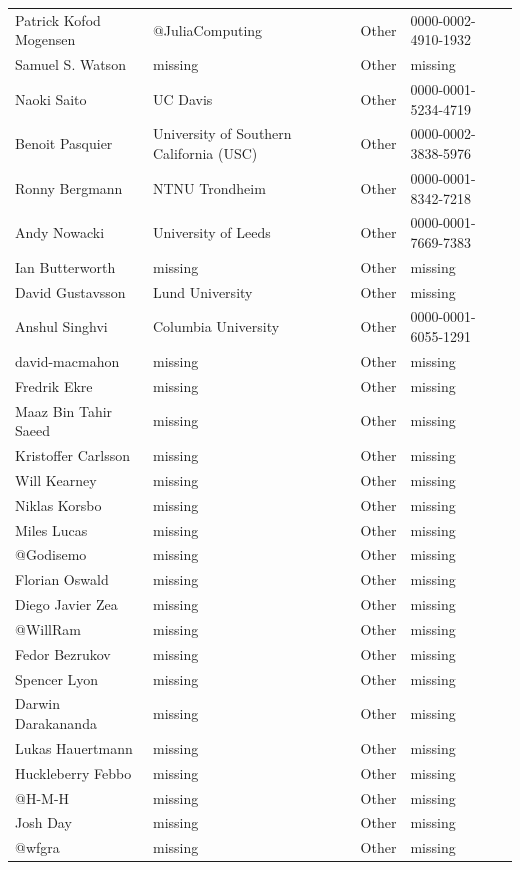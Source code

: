 \begin{longtable}{p{4cm}p{4cm}ll}
  Patrick Kofod Mogensen & @JuliaComputing & Other & 0000-0002-4910-1932 \\
  Samuel S. Watson & missing & Other & missing \\
  Naoki Saito & UC Davis & Other & 0000-0001-5234-4719 \\
  Benoit Pasquier & University of Southern California (USC) & Other & 0000-0002-3838-5976 \\
  Ronny Bergmann & NTNU Trondheim & Other & 0000-0001-8342-7218 \\
  Andy Nowacki & University of Leeds & Other & 0000-0001-7669-7383 \\
  Ian Butterworth & missing & Other & missing \\
  David Gustavsson & Lund University & Other & missing \\
  Anshul Singhvi & Columbia University & Other & 0000-0001-6055-1291 \\
  david-macmahon & missing & Other & missing \\
  Fredrik Ekre & missing & Other & missing \\
  Maaz Bin Tahir Saeed & missing & Other & missing \\
  Kristoffer Carlsson & missing & Other & missing \\
  Will Kearney & missing & Other & missing \\
  Niklas Korsbo & missing & Other & missing \\
  Miles Lucas & missing & Other & missing \\
  @Godisemo & missing & Other & missing \\
  Florian Oswald & missing & Other & missing \\
  Diego Javier Zea & missing & Other & missing \\
  @WillRam & missing & Other & missing \\
  Fedor Bezrukov & missing & Other & missing \\
  Spencer Lyon & missing & Other & missing \\
  Darwin Darakananda & missing & Other & missing \\
  Lukas Hauertmann & missing & Other & missing \\
  Huckleberry Febbo & missing & Other & missing \\
  @H-M-H & missing & Other & missing \\
  Josh Day & missing & Other & missing \\
  @wfgra & missing & Other & missing \\

\end{longtable}
